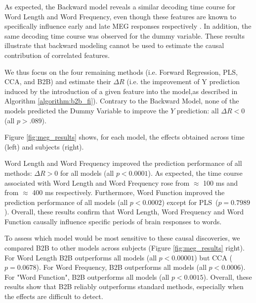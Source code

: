 As expected, the Backward model reveals a similar decoding time course for Word
Length and Word Frequency, even though these features are known to specifically
influence early and late MEG responses respectively \citep{kutas2011thirty}. In
addition, the same decoding time course was observed for the dummy variable.
These results illustrate that backward modeling cannot be used to estimate the
causal contribution of correlated features.

We thus focus on the four remaining methods (i.e. Forward Regression, PLS, CCA,
and B2B) and estimate their $\Delta R$ (i.e. the improvement of Y prediction
induced by the introduction of a given feature into the model,as described in
Algorithm \ref{algorithm:b2b_fi}). Contrary to the Backward Model, none of the
models predicted the Dummy Variable to improve the $Y$ prediction: all $\Delta R
< 0$ (all $p > .089$).

Figure \ref{fig:meg_results} shows, for each model, the effects obtained across
time (left) and subjects (right).

Word Length and Word Frequency improved the prediction performance of all
methods: $\Delta R>0$ for all models (all $p<0.0001$). As expected, the time
course associated with Word Length and Word Frequency rose from $\approx$ 100 ms
and from $\approx$ 400 ms respectively. Furthermore, Word Function improved the
prediction performance of all models (all $p < 0.0002$) except for
PLS~($p=0.7989$). Overall, these results confirm that Word Length, Word
Frequency and Word Function causally influence specific periods of brain
responses to words.

To assess which model would be most sensitive to these causal discoveries, we
compared B2B to other models across subjects (Figure \ref{fig:meg_results}
right). For Word Length B2B outperforms all models (all $p < 0.00001$) but CCA
($p=0.0678$). For Word Frequency, B2B outperforms all models (all $p < 0.0006$).
For "Word Function", B2B outperforms all models (all $p < 0.0015$). Overall,
these results show that B2B reliably outperforms standard methods, especially
when the effects are difficult to detect.
